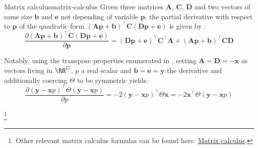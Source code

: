 \begin{Property}{Matrix calculus}{matrix-calculus}
Given three matrices $\boldsymbol{A}$, $\boldsymbol{C}$, $\boldsymbol{D}$ and two vectors of same size $\boldsymbol{b}$ and $\boldsymbol{e}$ not depending of variable $\boldsymbol{p}$, the partial derivative with respect to $\boldsymbol{p}$ of the quadratic form $(\boldsymbol{A} \boldsymbol{p} + \boldsymbol{b})^\top \boldsymbol{C} (\boldsymbol{D} \boldsymbol{p} + \boldsymbol{e})$ is given by :
\begin{equation}
\label{eq:general-calculus-formula}
    \frac{\partial (\boldsymbol{A} \boldsymbol{p} + \boldsymbol{b})^\top \boldsymbol{C} (\boldsymbol{D} \boldsymbol{p} + \boldsymbol{e})}{\partial \boldsymbol{p}} = (\boldsymbol{D} \boldsymbol{p} + \boldsymbol{e})^\top \boldsymbol{C}^\top \boldsymbol{A} + (\boldsymbol{A} \boldsymbol{p} + \boldsymbol{b})^\top \boldsymbol{C} \boldsymbol{D}
\end{equation}

Notably, using the transpose properties enumerated in , setting $\boldsymbol{A} = \boldsymbol{D} = - \boldsymbol{x}$ as vectors living in $\RR^G$, $p$ a real scalar and $\boldsymbol{b} = \boldsymbol{e} = \boldsymbol{y}$ the derivative  and additionally coercing $\Theta$ to be symmetric yields:
\begin{equation*}
\label{eq:general-calculus-formula-easy}
    \frac{\partial (\boldsymbol{y} - \boldsymbol{x} p)^\top \Theta (\boldsymbol{y} - \boldsymbol{x} p)}{\partial p} = -2  (\boldsymbol{y} - \boldsymbol{x} p)^\top \Theta \boldsymbol{x} = -2 \boldsymbol{x}^\top \Theta (\boldsymbol{y} - \boldsymbol{x} p)
\end{equation*}

\footnote{Other relevant matrix calculus formulas can be found here: \href{https://en.wikipedia.org/wiki/Matrix_calculus\#Scalar-by-vector}{Matrix calculus}.}
\end{Property}


